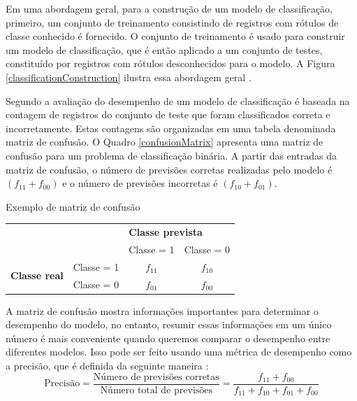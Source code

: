 {}

Em uma abordagem geral, para a construção de um modelo de classificação,
primeiro, um conjunto de treinamento consistindo de registros com rótulos de
classe conhecido é fornecido. O conjunto de treinamento é usado para construir
um modelo de classificação, que é então aplicado a um conjunto de testes,
constituído por registros com rótulos desconhecidos para o modelo. A Figura
\ref{classificationConstruction} ilustra essa abordagem geral
\cite{tan2009introduccao}.

Segundo  a avaliação do desempenho de um modelo
de classificação é baseada na contagem de registros do conjunto de teste que
foram classificados correta e incorretamente. Estas contagens são organizadas em
uma tabela denominada matriz de confusão. O Quadro \ref{confusionMatrix}
apresenta uma matriz de confusão para um problema de classificação binária. A
partir das entradas da matriz de confusão, o número de previsões corretas
realizadas pelo modelo é \((f_{11} + f_{00})\) e o número de previsões
incorretas é \((f_{10} + f_{01})\).

\begin{quadro}[]
  \centering
  \caption{Exemplo de matriz de confusão}
  \label{confusionMatrix}
  \begin{tabular}{ll|c|c|}
    \cline{3-4}
    \multicolumn{1}{c}{\textbf{}} & \multicolumn{1}{c|}{\textbf{}} & \multicolumn{2}{l|}{\textbf{Classe prevista}} \\ \cline{3-4}
    & \multicolumn{1}{c|}{\textbf{}} & Classe = 1 & Classe = 0 \\ \hline
    \multicolumn{1}{|l|}{\multirow{2}{*}{\textbf{Classe real}}} & Classe = 1 & $f_{11}$ & $f_{10}$ \\ \cline{2-4}
    \multicolumn{1}{|l|}{} & Classe = 0 & $f_{01}$ & $f_{00}$ \\ \hline
  \end{tabular}
  \Ididthis
\end{quadro}

A matriz de confusão mostra informações importantes para determinar o desempenho
do modelo, no entanto, resumir essas informações em um único número é mais
conveniente quando queremos comparar o desempenho entre  diferentes modelos.
Isso pode ser feito usando uma métrica de desempenho como a precisão, que é
definida da seguinte maneira \cite{tan2009introduccao}:
\[
  \text{Precisão} =
  \frac
    {\text{Número de previsões corretas}}
    {\text{Número total de previsões}} =
  \frac
    {f_{11} + f_{00}}
    {f_{11} + f_{10} + f_{01} + f_{00}}
\]

